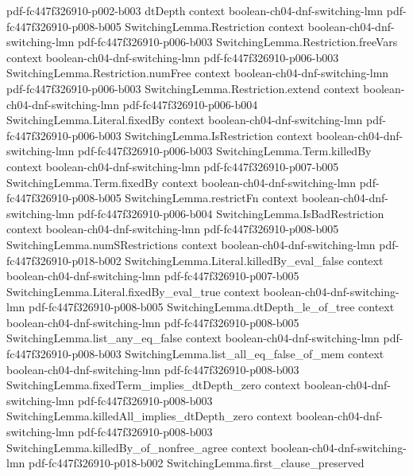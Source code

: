 \begin{theorem}
  {pdf-fc447f326910-p002-b003}
\proofstep
  {dtDepth}
  {context}
  {boolean-ch04-dnf-switching-lmn}
  {pdf-fc447f326910-p008-b005}
\proofstep
  {SwitchingLemma.Restriction}
  {context}
  {boolean-ch04-dnf-switching-lmn}
  {pdf-fc447f326910-p006-b003}
\proofstep
  {SwitchingLemma.Restriction.freeVars}
  {context}
  {boolean-ch04-dnf-switching-lmn}
  {pdf-fc447f326910-p006-b003}
\proofstep
  {SwitchingLemma.Restriction.numFree}
  {context}
  {boolean-ch04-dnf-switching-lmn}
  {pdf-fc447f326910-p006-b003}
\proofstep
  {SwitchingLemma.Restriction.extend}
  {context}
  {boolean-ch04-dnf-switching-lmn}
  {pdf-fc447f326910-p006-b004}
\proofstep
  {SwitchingLemma.Literal.fixedBy}
  {context}
  {boolean-ch04-dnf-switching-lmn}
  {pdf-fc447f326910-p006-b003}
\proofstep
  {SwitchingLemma.IsRestriction}
  {context}
  {boolean-ch04-dnf-switching-lmn}
  {pdf-fc447f326910-p006-b003}
\proofstep
  {SwitchingLemma.Term.killedBy}
  {context}
  {boolean-ch04-dnf-switching-lmn}
  {pdf-fc447f326910-p007-b005}
\proofstep
  {SwitchingLemma.Term.fixedBy}
  {context}
  {boolean-ch04-dnf-switching-lmn}
  {pdf-fc447f326910-p008-b005}
\proofstep
  {SwitchingLemma.restrictFn}
  {context}
  {boolean-ch04-dnf-switching-lmn}
  {pdf-fc447f326910-p006-b004}
\proofstep
  {SwitchingLemma.IsBadRestriction}
  {context}
  {boolean-ch04-dnf-switching-lmn}
  {pdf-fc447f326910-p008-b005}
\proofstep
  {SwitchingLemma.numSRestrictions}
  {context}
  {boolean-ch04-dnf-switching-lmn}
  {pdf-fc447f326910-p018-b002}
\proofstep
  {SwitchingLemma.Literal.killedBy_eval_false}
  {context}
  {boolean-ch04-dnf-switching-lmn}
  {pdf-fc447f326910-p007-b005}
\proofstep
  {SwitchingLemma.Literal.fixedBy_eval_true}
  {context}
  {boolean-ch04-dnf-switching-lmn}
  {pdf-fc447f326910-p008-b005}
\proofstep
  {SwitchingLemma.dtDepth_le_of_tree}
  {context}
  {boolean-ch04-dnf-switching-lmn}
  {pdf-fc447f326910-p008-b005}
\proofstep
  {SwitchingLemma.list_any_eq_false}
  {context}
  {boolean-ch04-dnf-switching-lmn}
  {pdf-fc447f326910-p008-b003}
\proofstep
  {SwitchingLemma.list_all_eq_false_of_mem}
  {context}
  {boolean-ch04-dnf-switching-lmn}
  {pdf-fc447f326910-p008-b003}
\proofstep
  {SwitchingLemma.fixedTerm_implies_dtDepth_zero}
  {context}
  {boolean-ch04-dnf-switching-lmn}
  {pdf-fc447f326910-p008-b003}
\proofstep
  {SwitchingLemma.killedAll_implies_dtDepth_zero}
  {context}
  {boolean-ch04-dnf-switching-lmn}
  {pdf-fc447f326910-p008-b003}
\proofstep
  {SwitchingLemma.killedBy_of_nonfree_agree}
  {context}
  {boolean-ch04-dnf-switching-lmn}
  {pdf-fc447f326910-p018-b002}
\proofstep
  {SwitchingLemma.first_clause_preserved}

\end{theorem}
